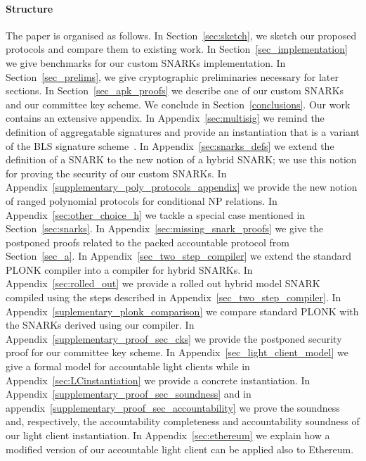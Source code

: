 \paragraph{Structure} The paper is organised as follows.
In Section~\ref{sec:sketch}, we sketch our proposed protocols and compare
them to existing work. In
Section~\ref{sec_implementation} we give benchmarks for our custom SNARKs
implementation.
In Section~\ref{sec_prelims}, we give cryptographic
preliminaries necessary for later sections. In Section~\ref{sec_apk_proofs}
we describe one of our custom SNARKs and our committee key scheme.
We conclude in Section~\ref{conclusions}. Our work contains an extensive appendix. 
In Appendix~\ref{sec:multisig} we remind the definition of aggregatable signatures and provide an 
instantiation that is a variant of the BLS signature scheme~\cite{BLS_signatures}. 
In Appendix~\ref{sec:snarks_defs} we extend the definition of a SNARK to the new notion of a hybrid SNARK; 
we use this notion for proving the security of our custom SNARKs. 
In Appendix~\ref{supplementary_poly_protocols_appendix} we provide the new notion of ranged polynomial protocols for conditional NP relations. 
In Appendix~\ref{sec:other_choice_h} we tackle a special case mentioned in Section~\ref{sec:snarks}. 
In Appendix~\ref{sec:missing_snark_proofs} we give the postponed proofs related to the packed accountable protocol from Section~\ref{sec_a}. 
In Appendix~\ref{sec_two_step_compiler} we extend the standard PLONK compiler into a compiler for hybrid SNARKs. 
In Appendix~\ref{sec:rolled_out} we provide a rolled out hybrid model SNARK compiled using the steps described in Appendix~\ref{sec_two_step_compiler}.
In Appendix~\ref{suplementary_plonk_comparison} we compare standard PLONK with the SNARKs derived using our compiler. 
In Appendix~\ref{supplementary_proof_sec_cks} we provide the postponed security proof for our committee key scheme. 
In Appendix~\ref{sec_light_client_model} we give a formal model for accountable light clients while in  
Appendix~\ref{sec:LCinstantiation} we provide a concrete instantiation. 
In Appendix~\ref{supplementary_proof_sec_soundness} and in appendix~\ref{supplementary_proof_sec_accountability} 
we prove the soundness and, respectively, the accountability completeness and accountability soundness of our light client instantiation. 
In Appendix~\ref{sec:ethereum} we explain how a modified version of our accountable light client can be applied also to Ethereum. 


\vspace{-0.25cm}
